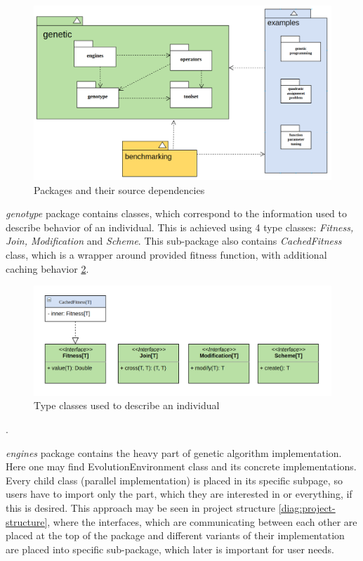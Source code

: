 \begin{figure}[h]
\centering\includegraphics[width=1.\textwidth]{img/diagrams/alleles-top-packages}
\caption{Packages and their source dependencies}\label{diag:packages}
\end{figure}

\textit{genotype} package contains classes, which correspond to the information used to describe behavior of an individual. This is achieved using 4 type classes: \textit{Fitness, Join, Modification} and \textit{Scheme}. This sub-package also contains \textit{CachedFitness} class, which is a wrapper around provided fitness function, with additional caching behavior \ref{diag:genotype-classes}. 

\begin{figure}[h]
\centering\includegraphics[width=1.\textwidth]{img/diagrams/alleles-genotype}
\caption{Type classes used to describe an individual}\label{diag:genotype-classes}
\end{figure}.

\textit{engines} package contains the heavy part of genetic algorithm implementation. Here one may find EvolutionEnvironment class and its concrete implementations. Every child class (parallel implementation) is placed in its specific subpage, so users have to import only the part, which they are interested in or everything, if this is desired. This approach may be seen in project structure \ref{diag:project-structure}, where the interfaces, which are communicating between each other are placed at the top of the package and different variants of their implementation are placed into specific sub-package, which later is important for user needs.


